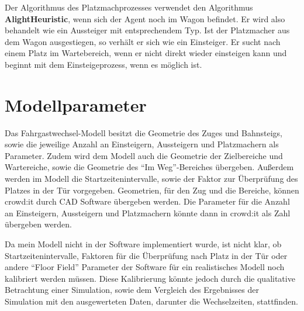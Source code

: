 Der Algorithmus des Platzmachprozesses verwendet den Algorithmus \textbf{AlightHeuristic}, wenn sich der Agent noch im Wagon befindet. Er wird also behandelt wie ein Aussteiger mit entsprechendem Typ. Ist der Platzmacher aus dem Wagon ausgestiegen, so verhält er sich wie ein Einsteiger. Er sucht nach einem Platz im Wartebereich, wenn er nicht direkt wieder einsteigen kann und beginnt mit dem Einsteigeprozess, wenn es möglich ist.
\section{Modellparameter} \label{Modellparameter}
Das Fahrgastwechsel-Modell besitzt die Geometrie des Zuges und Bahnsteigs, sowie die jeweilige Anzahl an Einsteigern, Aussteigern und Platzmachern als Parameter. Zudem wird dem Modell auch die Geometrie der Zielbereiche und Wartereiche, sowie die Geometrie des "`Im Weg"'-Bereiches übergeben. Außerdem werden im Modell die Startzeitenintervalle, sowie der Faktor zur Überprüfung des Platzes in der Tür vorgegeben. Geometrien, für den Zug und die Bereiche, können crowd:it durch CAD Software übergeben werden. Die Parameter für die Anzahl an Einsteigern, Aussteigern und Platzmachern könnte dann in crowd:it als Zahl übergeben werden. 

Da mein Modell nicht in der Software implementiert wurde, ist nicht klar, ob Startzeitenintervalle, Faktoren für die Überprüfung nach Platz in der Tür oder andere "`Floor Field"' Parameter der Software für ein realistisches Modell noch kalibriert werden müssen. Diese Kalibrierung könnte jedoch durch die qualitative Betrachtung einer Simulation, sowie dem Vergleich des Ergebnisses der Simulation mit den ausgewerteten Daten, darunter die Wechselzeiten, stattfinden.